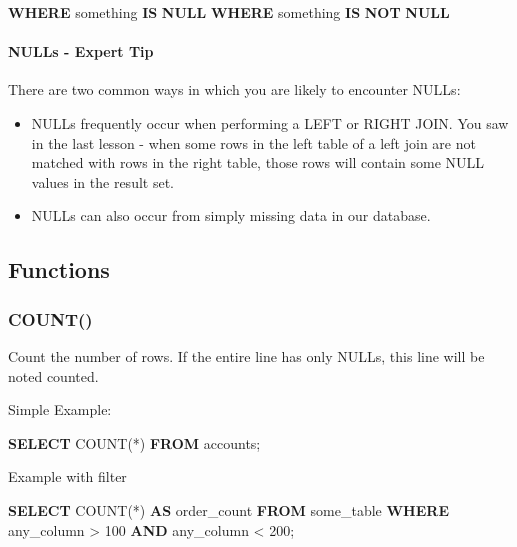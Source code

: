 \documentclass[]{book}
\newenvironment{Shaded}{\begin{snugshade}}{\end{snugshade}}
\newcommand{\KeywordTok}[1]{\textcolor[rgb]{0.13,0.29,0.53}{\textbf{#1}}}
\newcommand{\DecValTok}[1]{\textcolor[rgb]{0.00,0.00,0.81}{#1}}
\newcommand{\FunctionTok}[1]{\textcolor[rgb]{0.00,0.00,0.00}{#1}}
\newcommand{\NormalTok}[1]{#1}
\providecommand{\tightlist}{%
  \setlength{\itemsep}{0pt}\setlength{\parskip}{0pt}}
\let\oldparagraph\paragraph
\renewcommand{\paragraph}[1]{\oldparagraph{#1}\mbox{}}
\begin{document}
\begin{Shaded}
\begin{Highlighting}[]
\KeywordTok{WHERE}\NormalTok{ something }\KeywordTok{IS} \KeywordTok{NULL}
\KeywordTok{WHERE}\NormalTok{ something }\KeywordTok{IS} \KeywordTok{NOT} \KeywordTok{NULL}
\end{Highlighting}
\end{Shaded}

\paragraph{NULLs - Expert Tip}\label{nulls---expert-tip}

There are two common ways in which you are likely to encounter NULLs:

\begin{itemize}
\tightlist
\item
  NULLs frequently occur when performing a LEFT or RIGHT JOIN. You saw
  in the last lesson - when some rows in the left table of a left join
  are not matched with rows in the right table, those rows will contain
  some NULL values in the result set.
\item
  NULLs can also occur from simply missing data in our database.
\end{itemize}

\subsection{Functions}\label{functions}

\subsubsection{COUNT()}\label{count}

Count the number of rows. If the entire line has only NULLs, this line
will be noted counted.

Simple Example:

\begin{Shaded}
\begin{Highlighting}[]
\KeywordTok{SELECT} \FunctionTok{COUNT}\NormalTok{(*)}
\KeywordTok{FROM}\NormalTok{ accounts;}
\end{Highlighting}
\end{Shaded}

Example with filter

\begin{Shaded}
\begin{Highlighting}[]
\KeywordTok{SELECT} \FunctionTok{COUNT}\NormalTok{(*) }\KeywordTok{AS}\NormalTok{ order_count}
\KeywordTok{FROM}\NormalTok{ some_table}
\KeywordTok{WHERE}\NormalTok{ any_column > }\DecValTok{100} \KeywordTok{AND}\NormalTok{ any_column < }\DecValTok{200}\NormalTok{;}
\end{Highlighting}
\end{Shaded}
\end{document}
